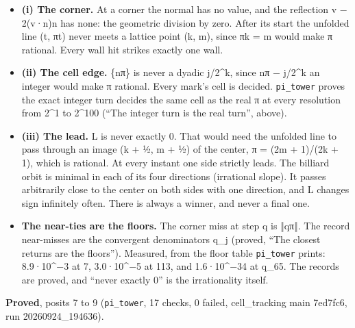\begin{itemize}
\begin{itemize}
\item \textbf{(i) The corner.} At a corner the normal has no value, and the reflection v − 2(v·n)n has none: the geometric division by zero. After its start the unfolded line (t, πt) never meets a lattice point (k, m), since πk = m would make π rational. Every wall hit strikes exactly one wall.
\item \textbf{(ii) The cell edge.} \{nπ\} is never a dyadic j/2\textasciicircum{}k, since nπ − j/2\textasciicircum{}k an integer would make π rational. Every mark's cell is decided. \texttt{pi\_\allowbreak{}tower} proves the exact integer turn decides the same cell as the real π at every resolution from 2\textasciicircum{}1 to 2\textasciicircum{}100 (“The integer turn is the real turn”, above).
\item \textbf{(iii) The lead.} L is never exactly 0. That would need the unfolded line to pass through an image (k + ½, m + ½) of the center, π = (2m + 1)/(2k + 1), which is rational. At every instant one side strictly leads. The billiard orbit is minimal in each of its four directions (irrational slope). It passes arbitrarily close to the center on both sides with one direction, and L changes sign infinitely often. There is always a winner, and never a final one.
\item \textbf{The near-ties are the floors.} The corner miss at step q is ‖qπ‖. The record near-misses are the convergent denominators q\_\allowbreak{}j (proved, “The closest returns are the floors”). Measured, from the floor table \texttt{pi\_\allowbreak{}tower} prints: 8.9·10\textasciicircum{}−3 at 7, 3.0·10\textasciicircum{}−5 at 113, and 1.6·10\textasciicircum{}−34 at q\_\allowbreak{}65. The records are proved, and “never exactly 0” is the irrationality itself.
\end{itemize}
\end{itemize}

\textbf{Proved}, posits 7 to 9 (\texttt{pi\_\allowbreak{}tower}, 17 checks, 0 failed, cell\_\allowbreak{}tracking main 7ed7fc6, run 20260924\_\allowbreak{}194636).

